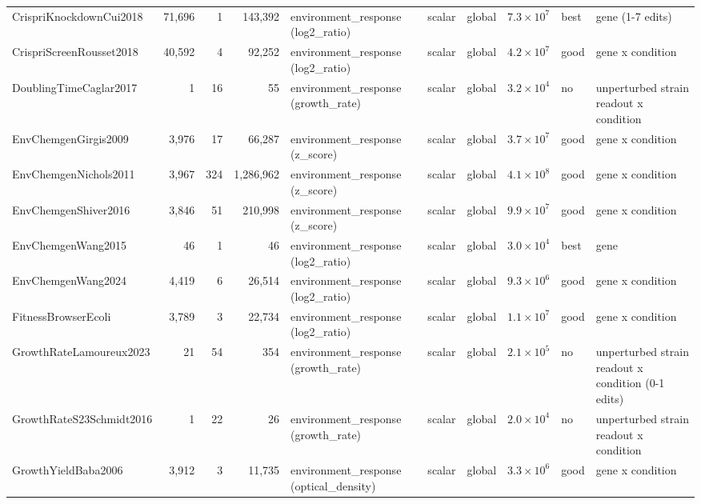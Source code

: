 \begin{landscape}
\begin{longtable}{@{}l r r r >{\raggedright\arraybackslash}p{34mm} l l r l >{\raggedright\arraybackslash}p{40mm}@{}}
CrispriKnockdownCui2018 & 71,696 & 1 & 143,392 & environment\_\allowbreak{}response (log2\_\allowbreak{}ratio) & scalar & global & $7.3\times10^{7}$ & best & 1 gene (1-7 edits) \\
CrispriScreenRousset2018 & 40,592 & 4 & 92,252 & environment\_\allowbreak{}response (log2\_\allowbreak{}ratio) & scalar & global & $4.2\times10^{7}$ & good & 1 gene x condition \\
DoublingTimeCaglar2017 & 1 & 16 & 55 & environment\_\allowbreak{}response (growth\_\allowbreak{}rate) & scalar & global & $3.2\times10^{4}$ & no & unperturbed strain readout x condition \\
EnvChemgenGirgis2009 & 3,976 & 17 & 66,287 & environment\_\allowbreak{}response (z\_\allowbreak{}score) & scalar & global & $3.7\times10^{7}$ & good & 1 gene x condition \\
EnvChemgenNichols2011 & 3,967 & 324 & 1,286,962 & environment\_\allowbreak{}response (z\_\allowbreak{}score) & scalar & global & $4.1\times10^{8}$ & good & 1 gene x condition \\
EnvChemgenShiver2016 & 3,846 & 51 & 210,998 & environment\_\allowbreak{}response (z\_\allowbreak{}score) & scalar & global & $9.9\times10^{7}$ & good & 1 gene x condition \\
EnvChemgenWang2015 & 46 & 1 & 46 & environment\_\allowbreak{}response (log2\_\allowbreak{}ratio) & scalar & global & $3.0\times10^{4}$ & best & 1 gene \\
EnvChemgenWang2024 & 4,419 & 6 & 26,514 & environment\_\allowbreak{}response (log2\_\allowbreak{}ratio) & scalar & global & $9.3\times10^{6}$ & good & 1 gene x condition \\
FitnessBrowserEcoli & 3,789 & 3 & 22,734 & environment\_\allowbreak{}response (log2\_\allowbreak{}ratio) & scalar & global & $1.1\times10^{7}$ & good & 1 gene x condition \\
GrowthRateLamoureux2023 & 21 & 54 & 354 & environment\_\allowbreak{}response (growth\_\allowbreak{}rate) & scalar & global & $2.1\times10^{5}$ & no & unperturbed strain readout x condition (0-1 edits) \\
GrowthRateS23Schmidt2016 & 1 & 22 & 26 & environment\_\allowbreak{}response (growth\_\allowbreak{}rate) & scalar & global & $2.0\times10^{4}$ & no & unperturbed strain readout x condition \\
GrowthYieldBaba2006 & 3,912 & 3 & 11,735 & environment\_\allowbreak{}response (optical\_\allowbreak{}density) & scalar & global & $3.3\times10^{6}$ & good & 1 gene x condition \\

\end{longtable}
\end{landscape}
